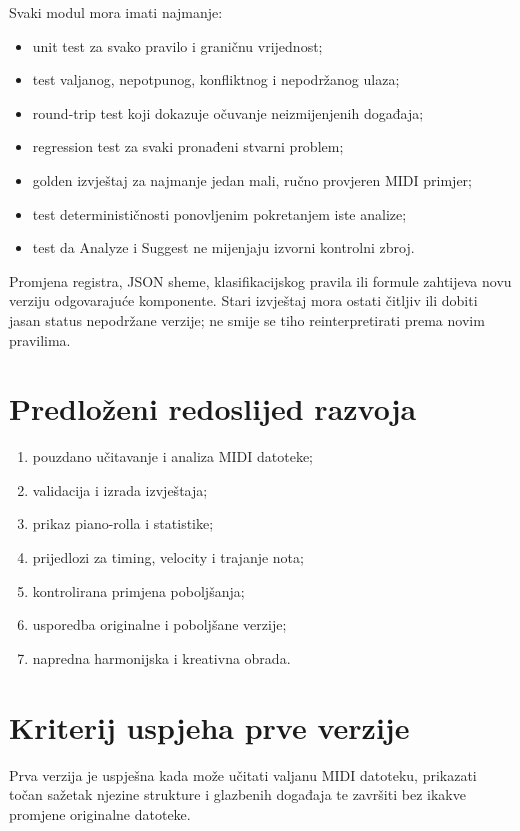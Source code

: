 \documentclass[11pt]{article}
\begin{document}
Svaki modul mora imati najmanje:

\begin{itemize}
    \item unit test za svako pravilo i graničnu vrijednost;
    \item test valjanog, nepotpunog, konfliktnog i nepodržanog ulaza;
    \item round-trip test koji dokazuje očuvanje neizmijenjenih događaja;
    \item regression test za svaki pronađeni stvarni problem;
    \item golden izvještaj za najmanje jedan mali, ručno provjeren MIDI primjer;
    \item test determinističnosti ponovljenim pokretanjem iste analize;
    \item test da Analyze i Suggest ne mijenjaju izvorni kontrolni zbroj.
\end{itemize}

Promjena registra, JSON sheme, klasifikacijskog pravila ili formule zahtijeva
novu verziju odgovarajuće komponente. Stari izvještaj mora ostati čitljiv ili
dobiti jasan status nepodržane verzije; ne smije se tiho reinterpretirati prema
novim pravilima.

\section{Predloženi redoslijed razvoja}

\begin{enumerate}
    \item pouzdano učitavanje i analiza MIDI datoteke;
    \item validacija i izrada izvještaja;
    \item prikaz piano-rolla i statistike;
    \item prijedlozi za timing, velocity i trajanje nota;
    \item kontrolirana primjena poboljšanja;
    \item usporedba originalne i poboljšane verzije;
    \item napredna harmonijska i kreativna obrada.
\end{enumerate}

\section{Kriterij uspjeha prve verzije}

Prva verzija je uspješna kada može učitati valjanu MIDI datoteku, prikazati
točan sažetak njezine strukture i glazbenih događaja te završiti bez ikakve
promjene originalne datoteke.
\end{document}

